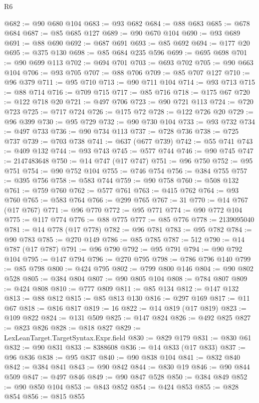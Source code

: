 \begin{lexlean}{R6}
\begin{coremodule}
@682 := @90 @680 @104
@683 := @93 @682
@684 := @88 @683
@685 := @678 @684
@687 := @85 @685 @127
@689 := @90 @670 @104
@690 := @93 @689
@691 := @88 @690
@692 := @687 @691
@693 := @85 @692
@694 := @177 @20
@695 := @375 @130
@698 := @85 @684 @235 @596
@699 := @695 @698
@701 := @90 @699 @113
@702 := @694 @701
@703 := @693 @702
@705 := @90 @663 @104
@706 := @93 @705
@707 := @88 @706
@709 := @85 @707 @127
@710 := @96 @379
@711 := @95 @710
@713 := @90 @711 @104
@714 := @93 @713
@715 := @88 @714
@716 := @709 @715
@717 := @85 @716
@718 := @175 @67
@720 := @122 @718 @20
@721 := @497 @706
@723 := @90 @721 @113
@724 := @720 @723
@725 := @717 @724
@726 := @175 @72
@728 := @122 @726 @20
@729 := @96 @399
@730 := @95 @729
@732 := @90 @730 @104
@733 := @93 @732
@734 := @497 @733
@736 := @90 @734 @113
@737 := @728 @736
@738 := @725 @737
@739 := @703 @738
@741 := @637 (@677 @739)
@742 := @55 @741
@743 := @409 @132
@744 := @93 @743
@745 := @577 @744
@746 := @90 @745
@747 := 2147483648
@750 := @14 @747 (@17 @747)
@751 := @96 @750
@752 := @95 @751
@754 := @90 @752 @104
@755 := @746 @754
@756 := @384 @755
@757 := @395 @756
@758 := @583 @744
@759 := @90 @758
@760 := @508 @132
@761 := @759 @760
@762 := @577 @761
@763 := @415 @762
@764 := @93 @760
@765 := @583 @764
@766 := @299 @765
@767 := 31
@770 := @14 @767 (@17 @767)
@771 := @96 @770
@772 := @95 @771
@774 := @90 @772 @104
@775 := @117 @774
@776 := @88 @775
@777 := @85 @776
@778 := 2139095040
@781 := @14 @778 (@17 @778)
@782 := @96 @781
@783 := @95 @782
@784 := @90 @783
@785 := @270 @149
@786 := @85 @785
@787 := 512
@790 := @14 @787 (@17 @787)
@791 := @96 @790
@792 := @95 @791
@794 := @90 @792 @104
@795 := @147 @794
@796 := @270 @795
@798 := @786 @796 @140
@799 := @85 @798
@800 := @424 @795
@802 := @799 @800 @146
@804 := @90 @802 @528
@805 := @384 @804
@807 := @90 @805 @104
@808 := @784 @807
@809 := @424 @808
@810 := @777 @809
@811 := @85 @134
@812 := @147 @132
@813 := @88 @812
@815 := @85 @813 @130
@816 := @297 @169
@817 := @11 @67
@818 := @816 @817
@819 := 16
@822 := @14 @819 (@17 @819)
@823 := @109 @822
@824 := @131 @509
@825 := @147 @824
@826 := @492 @825
@827 := @823 @826
@828 := @818 @827
@829 := LexLeanTarget.TargetSyntax.Expr.field
@830 := @829 @179
@831 := @830 @61
@832 := @90 @831
@833 := 8388608
@836 := @14 @833 (@17 @833)
@837 := @96 @836
@838 := @95 @837
@840 := @90 @838 @104
@841 := @832 @840
@842 := @384 @841
@843 := @90 @842
@844 := @830 @19
@846 := @90 @844 @509
@847 := @497 @846
@849 := @90 @847 @528
@850 := @384 @849
@852 := @90 @850 @104
@853 := @843 @852
@854 := @424 @853
@855 := @828 @854
@856 := @815 @855

\end{coremodule}
\end{lexlean}
